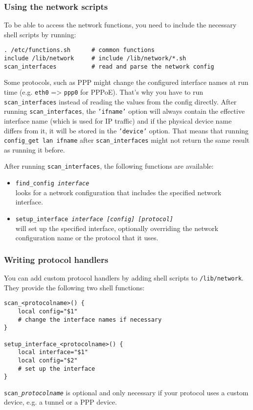 \subsubsection{Using the network scripts}

To be able to access the network functions, you need to include
the necessary shell scripts by running:

\begin{Verbatim}
. /etc/functions.sh      # common functions
include /lib/network     # include /lib/network/*.sh
scan_interfaces          # read and parse the network config
\end{Verbatim}

Some protocols, such as PPP might change the configured interface names
at run time (e.g. \texttt{eth0} => \texttt{ppp0} for PPPoE). That's why you have to run
\texttt{scan\_interfaces} instead of reading the values from the config directly.
After running \texttt{scan\_interfaces}, the \texttt{'ifname'} option will always contain
the effective interface name (which is used for IP traffic) and if the
physical device name differs from it, it will be stored in the \texttt{'device'}
option.
That means that running \texttt{config\_get lan ifname}
after \texttt{scan\_interfaces} might not return the same result as running it before.

After running \texttt{scan\_interfaces}, the following functions are available:

\begin{itemize}
    \item{\texttt{find\_config \textit{interface}}} \\
        looks for a network configuration that includes
        the specified network interface.

    \item{\texttt{setup\_interface \textit{interface [config] [protocol]}}} \\
      will set up the specified interface, optionally overriding the network configuration
      name or the protocol that it uses.
\end{itemize}

\subsubsection{Writing protocol handlers}

You can add custom protocol handlers by adding shell scripts to
\texttt{/lib/network}. They provide the following two shell functions:

\begin{Verbatim}
scan_<protocolname>() {
    local config="$1"
    # change the interface names if necessary
}

setup_interface_<protocolname>() {
    local interface="$1"
    local config="$2"
    # set up the interface
}
\end{Verbatim}

\texttt{scan\_\textit{protocolname}} is optional and only necessary if your protocol
uses a custom device, e.g. a tunnel or a PPP device.


